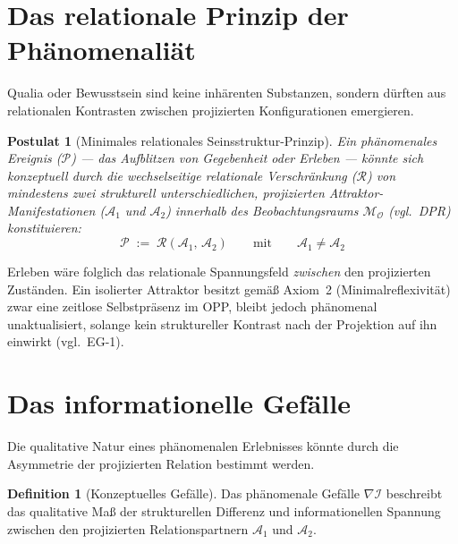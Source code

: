 \documentclass[11pt,a4paper]{article}
\theoremstyle{plain}
\newtheorem{postulate}{Postulat}[section]
\theoremstyle{definition}
\newtheorem{definition}{Definition}[section]
\begin{document}
\section{Das relationale Prinzip der Ph\"{a}nomenali\"{a}t}

Qualia oder Bewusstsein sind keine inh\"{a}renten Substanzen, sondern d\"{u}rften aus
relationalen Kontrasten zwischen projizierten Konfigurationen emergieren.

\begin{postulate}[Minimales relationales Seinsstruktur-Prinzip]
Ein ph\"{a}nomenales Ereignis ($\mathcal{P}$) --- das Aufblitzen von Gegebenheit oder
Erleben --- k\"{o}nnte sich konzeptuell durch die wechselseitige relationale
Verschr\"{a}nkung ($\mathcal{R}$) von mindestens zwei strukturell unterschiedlichen,
projizierten Attraktor-Manifestationen ($\mathcal{A}_1$ und $\mathcal{A}_2$) innerhalb
des Beobachtungsraums $\mathcal{M}_{\mathcal{O}}$ (vgl.\ DPR) konstituieren:
\[
  \mathcal{P} \;:=\; \mathcal{R}(\mathcal{A}_1,\, \mathcal{A}_2)
  \qquad \text{mit} \qquad
  \mathcal{A}_1 \neq \mathcal{A}_2
\]
\end{postulate}

Erleben w\"{a}re folglich das relationale Spannungsfeld \emph{zwischen} den projizierten
Zust\"{a}nden. Ein isolierter Attraktor besitzt gem\"{a}\ss{} Axiom~2 (Minimalreflexivit\"{a}t)
zwar eine zeitlose Selbstpr\"{a}senz im OPP, bleibt jedoch ph\"{a}nomenal unaktualisiert,
solange kein struktureller Kontrast nach der Projektion auf ihn einwirkt (vgl.\ EG-1).

\section{Das informationelle Gef\"{a}lle}

Die qualitative Natur eines ph\"{a}nomenalen Erlebnisses k\"{o}nnte durch die Asymmetrie
der projizierten Relation bestimmt werden.

\begin{definition}[Konzeptuelles Gef\"{a}lle]
Das ph\"{a}nomenale Gef\"{a}lle $\nabla \mathcal{I}$ beschreibt das qualitative Ma\ss{}
der strukturellen Differenz und informationellen Spannung zwischen den projizierten
Relationspartnern $\mathcal{A}_1$ und $\mathcal{A}_2$.
\end{definition}
\end{document}
